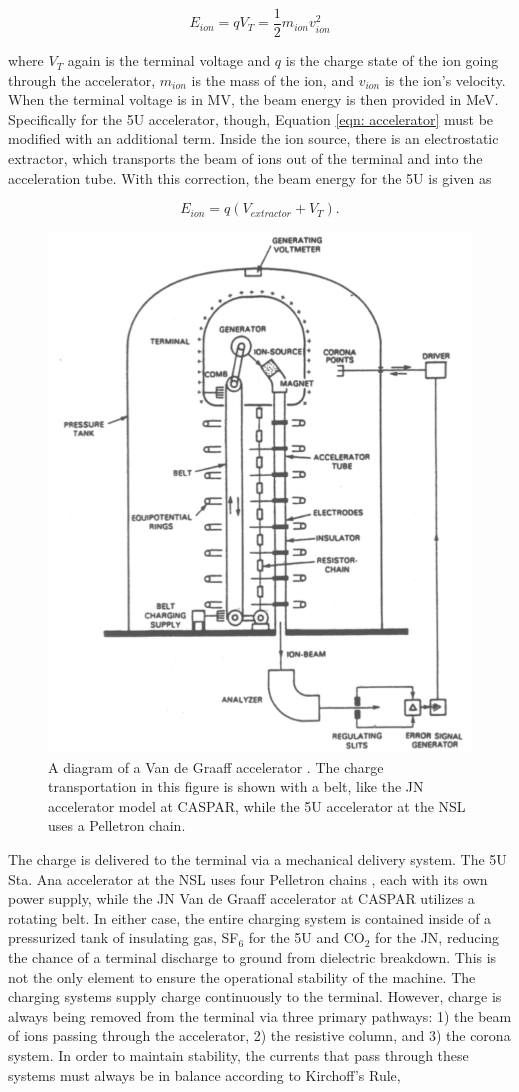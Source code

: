\begin{equation}
E_{ion} = qV_{T} = \dfrac{1}{2} m_{ion} v_{ion}^{2}
\label{eqn: accelerator}
\end{equation}

\noindent where $V_{T}$ again is the terminal voltage and $q$ is the charge state of the ion going through the accelerator, $m_{ion}$ is the mass of the ion, and $v_{ion}$ is the ion's velocity. When the terminal voltage is in MV, the beam energy is then provided in MeV. Specifically for the 5U accelerator, though, Equation \ref{eqn: accelerator} must be modified with an additional term. Inside the ion source, there is an electrostatic extractor, which transports the beam of ions out of the terminal and into the acceleration tube. With this correction, the beam energy for the 5U is given as

\begin{equation}
E_{ion} = q(V_{extractor} + V_{T}).
\label{eqn: beam energy}
\end{equation}

\begin{figure}
\centering
\includegraphics[width=0.5\linewidth]{figures/vdgDiagram.png}
\caption{A diagram of a Van de Graaff accelerator \cite{RolfsBook}. The charge transportation in this figure is shown with a belt, like the JN accelerator model at CASPAR, while the 5U accelerator at the NSL uses a Pelletron chain. }
\label{fig: vdg principles}
\end{figure}

The charge is delivered to the terminal via a mechanical delivery system. The 5U Sta. Ana accelerator at the NSL uses four Pelletron chains \cite{Herb1974}, each with its own power supply, while the JN Van de Graaff accelerator at CASPAR utilizes a rotating belt. In either case, the entire charging system is contained inside of a pressurized tank of insulating gas, SF$_{6}$ for the 5U and CO$_2$ for the JN, reducing the chance of a terminal discharge to ground from dielectric breakdown. This is not the only element to ensure the operational stability of the machine. The charging systems supply charge continuously to the terminal. However, charge is always being removed from the terminal via three primary pathways: 1) the beam of ions passing through the accelerator, 2) the resistive column, and 3) the corona system. In order to maintain stability, the currents that pass through these systems must always be in balance according to Kirchoff's Rule,

